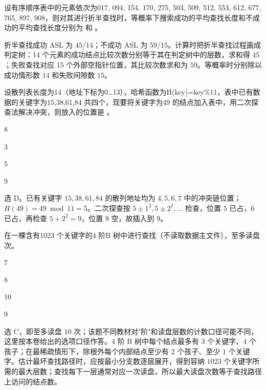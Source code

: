 \begin{question}
设有序顺序表中的元素依次为017, 094, 154, 170, 275, 503, 509, 512, 553, 612, 677, 765, 897, 908，则对其进行折半查找时，等概率下搜索成功的平均查找长度和不成功的平均查找长度分别为 \blank 和 \blank。
\begin{solution}
折半查找成功 ASL 为 $45/14$；不成功 ASL 为 $59/15$。计算时把折半查找过程画成判定树：14 个元素的成功结点比较次数分别等于其在判定树中的层数，求和得 $45$；失败查找对应 15 个外部空指针位置，其比较次数求和为 $59$。等概率时分别除以成功情形数 $14$ 和失败间隙数 $15$。
\end{solution}
\end{question}

\begin{question}
设散列表长度为14（地址下标为0…13），哈希函数为H(key)=key\%11，表中已有数据的关键字为15,38,61,84 共四个，现要将关键字为49 的结点加入表中，用二次探查法解决冲突，则放入的位置是 \blank。
\begin{choiceoptions}[2]
  \item 8
  \item 3
  \item 5
  \item 9
\end{choiceoptions}
\begin{solution}
选 D。已有关键字 $15,38,61,84$ 的散列地址均为 $4,5,6,7$ 中的冲突链位置；$H(49)=49\bmod 11=5$。二次探查按 $5\pm1^2,5\pm2^2,\ldots$ 检查，位置 $5$ 已占，$6$ 已占，再检查 $5+2^2=9$，位置 $9$ 空，故插入到 9。
\end{solution}
\end{question}

\begin{question}
在一棵含有1023 个关键字的4 阶B 树中进行查找（不读取数据主文件），至多读盘 \blank 次。
\begin{choiceoptions}[2]
  \item 7
  \item 8
  \item 10
  \item 9
\end{choiceoptions}
\begin{solution}
选 C，即至多读盘 $10$ 次；该题不同教材对"阶"和读盘层数的计数口径可能不同，这里按本卷给出的选项口径作答。4 阶 B 树中每个结点最多有 $3$ 个关键字、$4$ 个孩子；在最稀疏情形下，除根外每个内部结点至少有 $2$ 个孩子、至少 $1$ 个关键字。估计最坏查找路径时，应按最小分支数逐层展开，得到容纳 $1023$ 个关键字所需的最大层数；查找每下一层通常对应一次读盘，所以最大读盘次数等于查找路径上访问的结点数。
\end{solution}
\end{question}

